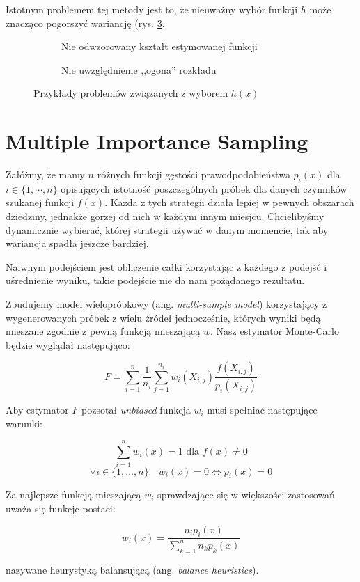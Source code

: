 \documentclass[../main.tex]{subfiles}
\begin{document}
Istotnym problemem tej metody jest to, że nieuważny wybór funkcji $h$ może
znacząco pogorszyć wariancję (rys. \ref{fig:ImportanceSamplingProblems}.

\begin{figure}
  \centering

  \begin{subfigure}[t]{0.45\textwidth}
    \label{fig:ImportanceSamplingWrongFunction}
    \caption{Nie odwzorowany kształt estymowanej funkcji}
  \end{subfigure}
  \begin{subfigure}[t]{0.45\textwidth}
    \centering
    \label{fig:ImportanceSamplingLostTail}
    \caption{Nie uwzględnienie ,,ogona'' rozkładu}
  \end{subfigure}

  \label{fig:ImportanceSamplingProblems}
  \caption{Przykłady problemów związanych z wyborem $h(x)$}
\end{figure}

\section{Multiple Importance Sampling}


Załóżmy, że mamy $n$ różnych funkcji gęstości prawodpodobieństwa $p_{i}(x)$ dla
$i \in \{ 1, \cdots, n \}$ opisujących istotność poszczególnych próbek dla
danych czynników szukanej funkcji $f(x)$. Każda z tych strategii działa lepiej
w pewnych obszarach dziedziny, jednakże gorzej od nich w każdym innym miesjcu.
Chcielibyśmy dynamicznie wybierać, której strategii używać w danym momencie,
tak aby wariancja spadła jeszcze bardziej.

Naiwnym podejściem jest obliczenie całki korzystając z każdego z podejść
i uśrednienie wyniku, takie podejście nie da nam pożądanego rezultatu.

Zbudujemy model wielopróbkowy (ang. \textit{multi-sample model})
\cite{pbrt}\cite{ImportanceSamplingForProduction} korzystający z wygenerowanych
próbek z wielu źródeł jednocześnie, których wyniki będą mieszane zgodnie z
pewną funkcją mieszającą $w$. Nasz estymator Monte-Carlo będzie wyglądał
następująco:

\[
  F = \sum_{i=1}^{n} \frac{1}{n_i} \sum_{j=1}^{n_i} w_{i}(X_{i,j}) \frac{
    f(X_{i,j})
  }{
    p_{i}(X_{i,j})
  }
\]

Aby estymator $F$ pozsotał \textit{unbiased} funkcja $w_i$ musi spełniać
następujące warunki:

\[ \sum_{i = 1}^{n} w_{i}(x) = 1 \text{ dla } f(x) \neq 0 \]
\[
  \forall i \in \{ 1, \ldots, n \} \quad
  w_{i}(x) = 0 \Leftrightarrow p_i(x) = 0
\]

Za najlepsze funkcją mieszającą $w_i$ sprawdzające się w większości zastosowań
uważa się funkcje postaci:

\[
  w_{i}(x) = \frac{
    n_{i} p_{i}(x)
  }{
    \sum_{k=1}^{n} {
      n_{k} p_{k}(x)
    }
  }
\]

\noindent nazywane heurystyką balansującą (ang. \textit{balance heuristics}).
\end{document}
